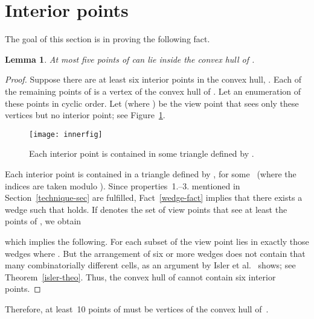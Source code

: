 \documentclass[11pt]{article}
\newtheorem{lemma}{Lemma}
\begin{document}
\bigskip


\section{Interior points}         \label{inner-sec}

The goal of this section is in proving the following fact.

\begin{lemma}            \label{inner-lem}
At most five points of  can lie inside the convex hull of .
\end{lemma}
\begin{proof}
Suppose there are at least six interior points  in the convex hull, .
Each of the remaining points of  is a vertex of the convex hull of .
Let  an enumeration of these points in cyclic order. Let  (where )
be the view point that sees only these vertices but no interior point; see Figure~\ref{inner-fig}.
\begin{figure}[hbtp]\begin{center}\texttt{[image: innerfig]}\caption{Each interior point  is contained in some triangle defined by \protect{}.}\label{inner-fig}
  \end{center}\end{figure}
Each interior point  is contained in a triangle defined by , for some~ 
(where the indices are taken modulo ). 
Since properties~{1.--3.} mentioned in Section~\ref{technique-sec} are fulfilled, Fact~\ref{wedge-fact}
implies that there exists a wedge  such that 
 holds. 
If  denotes the set of view points that see at least the points of , 
 we obtain

 which implies the following. For each subset  of  the view point 
  lies in exactly those wedges  where . But the arrangement
 of six or more wedges does not contain that many combinatorially different cells, as 
 an argument by Isler et al.~\cite{ikdv-vcdev-04} shows; see Theorem~\ref{isler-theo}. 
Thus, the convex hull of  cannot contain six interior points.
\end{proof}

Therefore, at least~10 points of  must be vertices of the convex hull of~.
\end{document}
